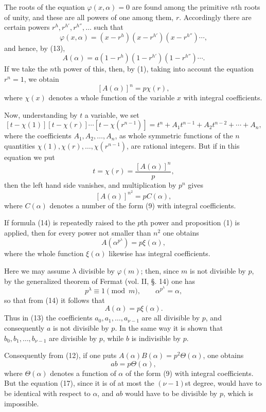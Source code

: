 \documentclass[11pt]{article}
\begin{document}
The roots of the equation $\varphi(x,\alpha)=0$ are found among the primitive $n$th roots of unity, and these are all powers of one among them, $r$. Accordingly there are certain powers $r^h,r^{h'},r^{h''},\ldots$ such that
\[
\varphi(x,\alpha)=(x-r^h)(x-r^{h'})(x-r^{h''})\cdots,
\]
and hence, by (13),
\[
A(\alpha)=a(1-r^h)(1-r^{h'})(1-r^{h''})\cdots .
\]
If we take the $n$th power of this, then, by (1), taking into account the equation $r^n=1$, we obtain
\[
[A(\alpha)]^n=p\chi(r),
\]
where $\chi(x)$ denotes a whole function of the variable $x$ with integral coefficients.

Now, understanding by $t$ a variable, we set
\[
[t-\chi(1)][t-\chi(r)]\cdots[t-\chi(r^{n-1})]
=t^n+A_1t^{n-1}+A_2t^{n-2}+\cdots+A_n,
\]
where the coefficients $A_1,A_2,\ldots,A_n$, as whole symmetric functions of the $n$ quantities $\chi(1),\chi(r),\ldots,\chi(r^{n-1})$, are rational integers. But if in this equation we put
\[
t=\chi(r)=\frac{[A(\alpha)]^n}{p},
\]
then the left hand side vanishes, and multiplication by $p^n$ gives
\begin{equation}\tag{14}
[A(\alpha)]^{n^2}=pC(\alpha),
\end{equation}
where $C(\alpha)$ denotes a number of the form (9) with integral coefficients.

If formula (14) is repeatedly raised to the $p$th power and proposition (1) is applied, then for every power not smaller than $n^2$ one obtains
\begin{equation}\tag{15}
A(\alpha^{p^\lambda})=p\xi(\alpha),
\end{equation}
where the whole function $\xi(\alpha)$ likewise has integral coefficients.

Here we may assume $\lambda$ divisible by $\varphi(m)$; then, since $m$ is not divisible by $p$, by the generalized theorem of Fermat (vol. II, §. 14) one has
\[
p^\lambda\equiv1 \pmod m,
\qquad
\alpha^{p^\lambda}=\alpha,
\]
so that from (14) it follows that
\begin{equation}\tag{16}
A(\alpha)=p\xi(\alpha).
\end{equation}
Thus in (13) the coefficients $a_0,a_1,\ldots,a_{\nu-1}$ are all divisible by $p$, and consequently $a$ is not divisible by $p$. In the same way it is shown that $b_0,b_1,\ldots,b_{\nu-1}$ are divisible by $p$, while $b$ is indivisible by $p$.

Consequently from (12), if one puts $A(\alpha)B(\alpha)=p^2\Theta(\alpha)$, one obtains
\begin{equation}\tag{17}
ab=p\Theta(\alpha),
\end{equation}
where $\Theta(\alpha)$ denotes a function of $\alpha$ of the form (9) with integral coefficients. But the equation (17), since it is of at most the $(\nu-1)$st degree, would have to be identical with respect to $\alpha$, and $ab$ would have to be divisible by $p$, which is impossible.
\end{document}
